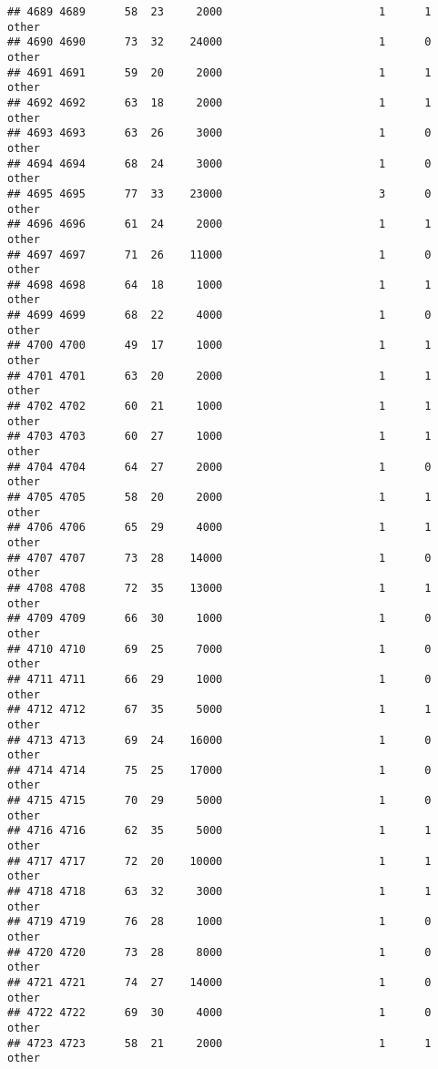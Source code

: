 \documentclass[
]{article}
\begin{document}
\begin{verbatim}
## 4689 4689      58  23     2000                        1      1    other
## 4690 4690      73  32    24000                        1      0    other
## 4691 4691      59  20     2000                        1      1    other
## 4692 4692      63  18     2000                        1      1    other
## 4693 4693      63  26     3000                        1      0    other
## 4694 4694      68  24     3000                        1      0    other
## 4695 4695      77  33    23000                        3      0    other
## 4696 4696      61  24     2000                        1      1    other
## 4697 4697      71  26    11000                        1      0    other
## 4698 4698      64  18     1000                        1      1    other
## 4699 4699      68  22     4000                        1      0    other
## 4700 4700      49  17     1000                        1      1    other
## 4701 4701      63  20     2000                        1      1    other
## 4702 4702      60  21     1000                        1      1    other
## 4703 4703      60  27     1000                        1      1    other
## 4704 4704      64  27     2000                        1      0    other
## 4705 4705      58  20     2000                        1      1    other
## 4706 4706      65  29     4000                        1      1    other
## 4707 4707      73  28    14000                        1      0    other
## 4708 4708      72  35    13000                        1      1    other
## 4709 4709      66  30     1000                        1      0    other
## 4710 4710      69  25     7000                        1      0    other
## 4711 4711      66  29     1000                        1      0    other
## 4712 4712      67  35     5000                        1      1    other
## 4713 4713      69  24    16000                        1      0    other
## 4714 4714      75  25    17000                        1      0    other
## 4715 4715      70  29     5000                        1      0    other
## 4716 4716      62  35     5000                        1      1    other
## 4717 4717      72  20    10000                        1      1    other
## 4718 4718      63  32     3000                        1      1    other
## 4719 4719      76  28     1000                        1      0    other
## 4720 4720      73  28     8000                        1      0    other
## 4721 4721      74  27    14000                        1      0    other
## 4722 4722      69  30     4000                        1      0    other
## 4723 4723      58  21     2000                        1      1    other

\end{verbatim}
\end{document}
